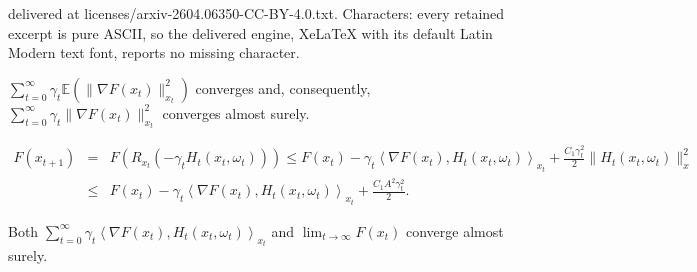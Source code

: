 \documentclass[10pt,a4paper]{amsart}
\newcommand{\E}{\mathbb{E}}
\newcommand{\g}{\gamma}
\begin{document}
delivered at licenses/arxiv-2604.06350-CC-BY-4.0.txt. Characters: every retained excerpt is pure ASCII, so the delivered engine, XeLaTeX with its default Latin Modern text font, reports no missing character.
\begin{lemma}\label{lemma-expectation-converges}
$\sum_{t=0}^\infty \g_t \E(\|\nabla F(x_t)\|_{x_t}^2)$ converges and, consequently, $\sum_{t=0}^\infty \g_t \|\nabla F(x_t)\|_{x_t}^2$ converges almost surely.
\end{lemma}

\begin{eqnarray}
\label{eq-expectation-converges-0} F(x_{t+1}) & = & F(R_{x_t}(-\g_t H_t(x_t,\omega_t))) \leq F(x_t) - \g_t\left\langle \nabla F(x_t), H_t(x_t,\omega_t) \right\rangle_{x_t} + \frac{C_1\g_t^2}{2}\|H_t(x_t,\omega_t)\|_x^2\\
\nonumber & \leq & F(x_t) - \g_t\left\langle \nabla F(x_t), H_t(x_t,\omega_t) \right\rangle_{x_t} + \frac{C_1A^2\g_t^2}{2}.
\end{eqnarray}

\begin{lemma}\label{lemma-F-x-t-converge}
Both $\sum_{t=0}^\infty \g_t\left\langle \nabla F(x_t), H_t(x_t,\omega_t)\right\rangle_{x_t}$ and $\lim_{t\rightarrow \infty} F(x_t)$ converge almost surely.
\end{lemma}
\end{document}
